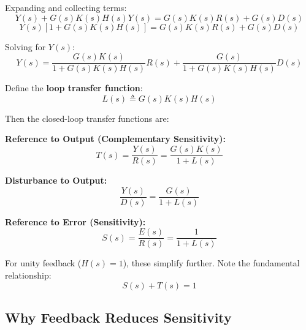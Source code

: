 Expanding and collecting terms:
\begin{equation}
Y(s) + G(s) K(s) H(s) Y(s) = G(s) K(s) R(s) + G(s) D(s)
\end{equation}
\begin{equation}
Y(s) \left[ 1 + G(s) K(s) H(s) \right] = G(s) K(s) R(s) + G(s) D(s)
\end{equation}

Solving for $Y(s)$:
\begin{equation}
\boxed{Y(s) = \frac{G(s) K(s)}{1 + G(s) K(s) H(s)} R(s) + \frac{G(s)}{1 + G(s) K(s) H(s)} D(s)}
\label{eq:closedloop_general}
\end{equation}

Define the \textbf{loop transfer function}:
\begin{equation}
L(s) \triangleq G(s) K(s) H(s)
\label{eq:loop_tf}
\end{equation}

Then the closed-loop transfer functions are:

\begin{tcolorbox}[colback=green!5!white,colframe=green!75!black,title=Fundamental Closed-Loop Transfer Functions,sharp corners]
\textbf{Reference to Output (Complementary Sensitivity):}
\begin{equation}
T(s) = \frac{Y(s)}{R(s)} = \frac{G(s) K(s)}{1 + L(s)}
\label{eq:complementary_sensitivity}
\end{equation}

\textbf{Disturbance to Output:}
\begin{equation}
\frac{Y(s)}{D(s)} = \frac{G(s)}{1 + L(s)}
\label{eq:disturbance_tf}
\end{equation}

\textbf{Reference to Error (Sensitivity):}
\begin{equation}
S(s) = \frac{E(s)}{R(s)} = \frac{1}{1 + L(s)}
\label{eq:sensitivity}
\end{equation}
\end{tcolorbox}

For unity feedback ($H(s) = 1$), these simplify further. Note the fundamental relationship:
\begin{equation}
S(s) + T(s) = 1
\label{eq:sensitivity_complementary}
\end{equation}

\subsection{Why Feedback Reduces Sensitivity}

